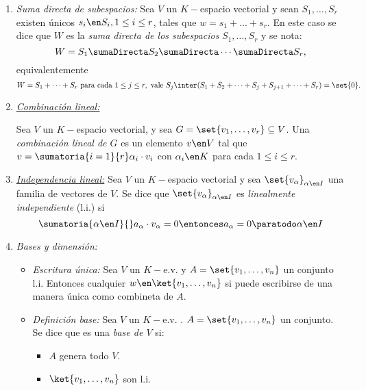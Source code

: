 \begin{enumerate}[label=\tiny\purple{\faIcon{snowman}}]
  \item \textit{Suma directa de subespacios:} Sea $V$ un $K-$espacio vectorial y sean
        $S_1,\ldots,S_r$ existen únicos $s_i \en S_i, 1\leq i \leq r$, tales que
        $w = s_1 +\ldots + s_r$. En este caso se dice que $W$ es la \textit{suma directa de los
          subespacios} $S_1,\ldots,S_r$ y se nota:
        $$
          W = S_1 \sumaDirecta S_2 \sumaDirecta \cdots \sumaDirecta S_r,
        $$
        equivalentemente
        $$
          W = S_1 + \cdots + S_r  \text{ para cada } 1\leq j \leq r, \text{ vale }
          S_j \inter (S_1 + S_2 + \cdots + S_j + S_{j+1} + \cdots + S_r) = \set{0}.
        $$

  \item \hypertarget{teoria-1:combinacion-lineal}{\textit{\ul{Combinación lineal:}}}

        Sea $V$ un $K-$espacio vectorial, y sea $G = \set{v_1,\ldots,v_r} \subseteq V$.
        Una \textit{combinación lineal de $G$} es un elemento $v \en V$ tal que $v = \sumatoria{i=1}{r} \alpha_i \cdot v_i$ con
        $\alpha_i \en K$ para cada $1 \leq i \leq r$.

  \item\textit{\ul{Independencia lineal:}}
        Sea $V$ un $K-$espacio vectorial y sea $\set{v_\alpha}_{\alpha \en I}$ una familia de vectores de $V$. Se
        dice que  $\set{v_{\alpha}}_{\alpha \en I}$ es \textit{linealmente independiente} (l.i.) si
        $$
          \sumatoria{\alpha \en I}{} a_{\alpha} \cdot v_{\alpha} = 0 \entonces a_{\alpha} = 0 \paratodo \alpha \en I
        $$

  \item \textit{Bases y dimensión:}
        \begin{itemize}
          \item \textit{Escritura única:}
                Sea $V$ un $K-$e.v. y $A = \set{v_1,\ldots,v_n}$ un conjunto l.i. Entonces cualquier $w \en \ket{v_1,\ldots, v_n}$ si puede
                escribirse de una manera única como combineta de $A$.

          \item \textit{Definición base:}
                Sea $V$ un $K-$e.v. . $A = \set{v_1,\ldots,v_n}$ un conjunto. Se dice que es una \textit{base de $V$} si:
                \begin{itemize}
                  \item $A$ genera todo $V$.
                  \item $\ket{v_1,\ldots, v_n}$ son l.i.
                \end{itemize}


\end{itemize}
\end{enumerate}
